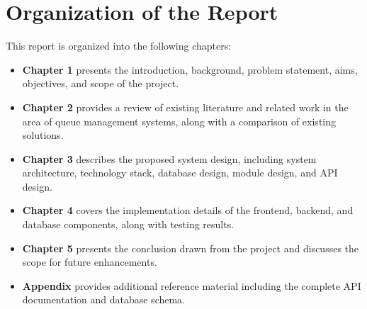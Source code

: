 \section{Organization of the Report}

This report is organized into the following chapters:

\begin{itemize}
    \item \textbf{Chapter 1} presents the introduction, background, problem statement, aims, objectives, and scope of the project.
    \item \textbf{Chapter 2} provides a review of existing literature and related work in the area of queue management systems, along with a comparison of existing solutions.
    \item \textbf{Chapter 3} describes the proposed system design, including system architecture, technology stack, database design, module design, and API design.
    \item \textbf{Chapter 4} covers the implementation details of the frontend, backend, and database components, along with testing results.
    \item \textbf{Chapter 5} presents the conclusion drawn from the project and discusses the scope for future enhancements.
    \item \textbf{Appendix} provides additional reference material including the complete API documentation and database schema.
\end{itemize}
